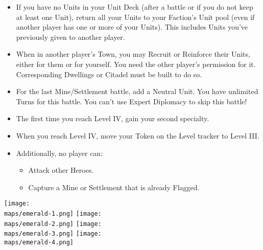 \begin{multicols*}{2}
\begin{itemize}
    \item If you have no Units in your Unit Deck (after a battle or if you do not keep at least one Unit), return all your Units to your Faction's Unit pool (even if another player has one or more of your Units). This includes Units you've previously given to another player.

    \item When in another player's Town, you may Recruit or Reinforce their Units, either for them or for yourself. You need the other player's permission for it. Corresponding Dwellings or Citadel must be built to do so.

    \item For the last Mine/Settlement battle, add a  Neutral Unit. You have unlimited Turns for this battle. You can't use Expert Diplomacy to skip this battle!

    \item The first time you reach Level IV, gain your second specialty.

    \item When you reach Level IV, move your Token on the Level tracker to Level III.

    \item Additionally, no player can:
    \begin{itemize}
        \item Attack other Heroes.
        \item Capture a Mine or Settlement that is already Flagged.
    \end{itemize}
\end{itemize}

\vspace{2em}

\begin{center}
  \texttt{[image: \\maps/emerald-1.png]}
  \vspace{3em}
  \texttt{[image: \\maps/emerald-2.png]}
  \vspace{3em}
  \texttt{[image: \\maps/emerald-3.png]}
  \vspace{3em}
  \texttt{[image: \\maps/emerald-4.png]}
\end{center}

\end{multicols*}
